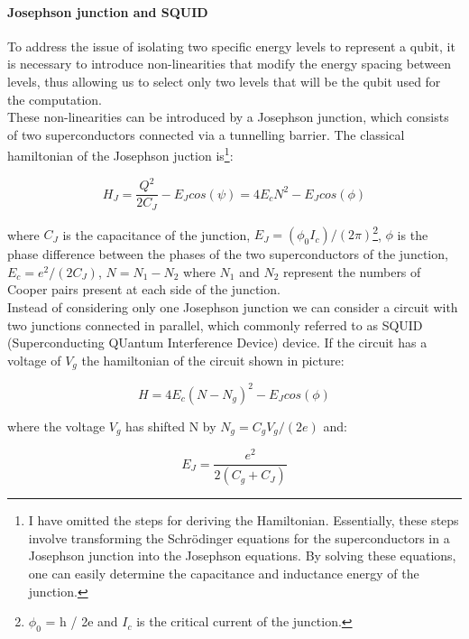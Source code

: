 \paragraph*{Josephson junction and SQUID}

To address the issue of isolating two specific energy levels to represent a qubit, it is necessary to introduce non-linearities that modify the energy spacing between levels, thus allowing us to select only two
levels that will be the qubit used for the computation.\\
These non-linearities can be introduced by a Josephson junction, which consists of two superconductors 
connected via a tunnelling barrier.
The classical hamiltonian of the Josephson juction is\footnote[1]{I have omitted the steps for deriving the Hamiltonian. 
Essentially, these steps involve transforming the Schrödinger equations for the superconductors in a Josephson junction into 
the Josephson equations. By solving these equations, one can easily determine the capacitance and inductance energy of the junction.}:

\begin{equation}
    H_J = \frac{Q^2}{2 C_J} - E_J cos(\psi) = 4 E_c N^2 - E_J cos(\phi)
\end{equation}

where $C_J$ is the capacitance of the junction, $E_J = (\phi_0 I_c) / (2 \pi)$\footnote[2]{$\phi_0$ = h / 2e and $I_c$ is the critical current of 
the junction.}, $\phi$ is the phase difference between the phases of the two superconductors of the junction, $E_c = e^2 / (2C_J)$, $N = N_1 - N_2$ 
where $N_1$ and $N_2$ represent the numbers of Cooper pairs present at each side of the junction.\\
Instead of considering only one Josephson junction we can consider a circuit with two junctions connected in parallel, which commonly referred to as SQUID 
(Superconducting QUantum Interference Device) device.
If the circuit has a voltage of $V_g$ the hamiltonian of the circuit shown in picture:

\begin{equation}
    H = 4 E_c (N - N_g)^2 - E_J cos(\phi)
\end{equation}

where the voltage $V_g$ has shifted N by $N_g = C_g V_g / (2e)$ and:

\begin{equation}
    E_J = \frac{e^2}{2(C_g + C_J)}
\end{equation}


